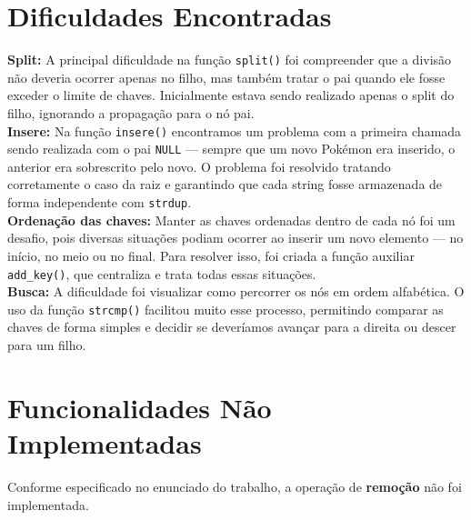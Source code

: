 \documentclass[12pt,a4paper]{article}
\begin{document}
\section{Dificuldades Encontradas}

\textbf{Split:} A principal dificuldade na função \texttt{split()} foi compreender que a divisão não deveria ocorrer apenas no filho, mas também tratar o pai quando ele fosse exceder o limite de chaves. Inicialmente estava sendo realizado apenas o split do filho, ignorando a propagação para o nó pai.\\

\textbf{Insere:} Na função \texttt{insere()} encontramos um problema com a primeira chamada sendo realizada com o pai \texttt{NULL} — sempre que um novo Pokémon era inserido, o anterior era sobrescrito pelo novo. O problema foi resolvido tratando corretamente o caso da raiz e garantindo que cada string fosse armazenada de forma independente com \texttt{strdup}.\\

\textbf{Ordenação das chaves:} Manter as chaves ordenadas dentro de cada nó foi um desafio, pois diversas situações podiam ocorrer ao inserir um novo elemento — no início, no meio ou no final. Para resolver isso, foi criada a função auxiliar\\
\texttt{add\_key()}, que centraliza e trata todas essas situações.\\

\textbf{Busca:} A dificuldade foi visualizar como percorrer os nós em ordem alfabética. O uso da função \texttt{strcmp()} facilitou muito esse processo, permitindo comparar as chaves de forma simples e decidir se deveríamos avançar para a direita ou descer para um filho.

\section{Funcionalidades Não Implementadas}

Conforme especificado no enunciado do trabalho, a operação de \textbf{remoção} não foi implementada.

\end{document}
